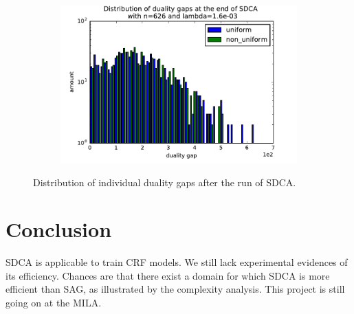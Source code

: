 \documentclass{article}
\DeclareMathOperator{\1}{\mathbb{1}}
\begin{document}
\begin{figure}[ht]
\begin{subfigure}[t]{0.3\textwidth}
    \end{subfigure}
    ~
    \begin{subfigure}[t]{0.3\textwidth}
        \centering
        \includegraphics[width=\textwidth]{images/20170914_040725_ocr_optdualgaps.pdf}
    \end{subfigure}
    \caption{Distribution of individual duality gaps after the run of SDCA.}
	\label{ocr duality gaps}
\end{figure}


\section*{Conclusion}

SDCA is applicable to train CRF models. 
We still lack experimental evidences of its efficiency.
Chances are that there exist a domain for which SDCA is more efficient than SAG, as illustrated by the complexity analysis.
This project is still going on at the MILA.

\printbibliography
\end{document}
